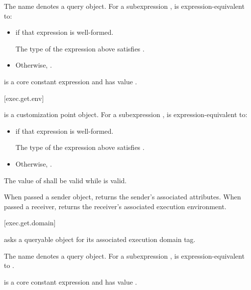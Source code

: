 \pnum
The name  denotes a query object.
For a subexpression ,
 is expression-equivalent to:
\begin{itemize}
\item
{}
if that expression is well-formed.

\mandates
The type of the expression above satisfies .

\item
Otherwise, .
\end{itemize}

\pnum
{} is a core constant expression and
has value .

[exec.get.env]{}

\pnum
{} is a customization point object.
For a subexpression ,
 is expression-equivalent to:
\begin{itemize}
\item
{}
if that expression is well-formed.

\mandates
The type of the expression above satisfies
.
\item
Otherwise, .
\end{itemize}

\pnum
The value of  shall be valid while  is valid.

\pnum
\begin{note}
When passed a sender object,
 returns the sender's associated attributes.
When passed a receiver,
 returns the receiver's associated execution environment.
\end{note}

[exec.get.domain]{}

\pnum
{} asks a queryable object
for its associated execution domain tag.

\pnum
The name  denotes a query object.
For a subexpression ,
 is expression-equivalent to
.

\pnum
{} is
a core constant expression and has value .

